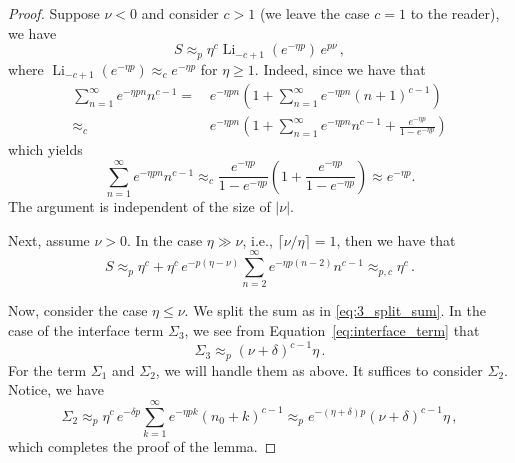 \documentclass[11pt]{amsart}
\theoremstyle{plain}
\theoremstyle{definition}
\newcommand		{\lt}			{\left}				%
\newcommand		{\rt}			{\right}			%
\renewcommand	{\(}			{\lt(}
\renewcommand	{\)}			{\rt)}
\newcommand		{\n}[1]			{\lt\lvert #1 \rt\rvert}
\begin{document}
	\begin{proof}
		Suppose $\nu<0$ and consider $c>1$ (we leave the case $c=1$ to the reader), we have 
		\begin{equation*}
			S \approx_p \eta^c \operatorname{Li}_{-c+1}(e^{-\eta p})\, e^{p\nu}\,,
		\end{equation*}
		where $\operatorname{Li}_{-c+1}(e^{-\eta p})\approx_c e^{-\eta p}$ for $\eta\ge 1$.
		Indeed, since we have that
        \begin{align*}
            \sum^\infty_{n=1}e^{-\eta p n}n^{c-1} =&\, e^{-\eta p n}\lt(1+\sum^\infty_{n=1}e^{-\eta p n} (n+1)^{c-1}\rt)
            \\
            \approx_c&\, e^{-\eta p n}\lt(1+\sum^\infty_{n=1}e^{-\eta p n} n^{c-1}+ \frac{e^{-\eta p}}{1-e^{-\eta p}}\rt) 
        \end{align*}
        which yields 
        \begin{equation*}
            \sum^\infty_{n=1}e^{-\eta p n}n^{c-1} \approx_c \frac{e^{-\eta p}}{1-e^{-\eta p}}\lt(1+\frac{e^{-\eta p}}{1-e^{-\eta p}}\rt) \approx e^{-\eta p}.
        \end{equation*}
        The argument is independent of the size of $\n{\nu}$.
        
        Next, assume $\nu> 0$. In the case $\eta\gg \nu$, i.e., $\lceil \nu/\eta\rceil = 1$, then we have that 
		\begin{equation*}
            S \approx_p  \eta^c + \eta^c \, e^{-p(\eta-\nu)}\sum^\infty_{n=2} e^{-\eta p (n-2)} n^{c-1} \approx_{p, c} \eta^c\,.
		\end{equation*}

		Now, consider the case $\eta\le \nu$. We split the sum as in \eqref{eq:3_split_sum}. In the case of the interface term $\Sigma_3$, we see from Equation~\eqref{eq:interface_term} that 
		\begin{equation*}
			\Sigma_3 \approx_p \lt(\nu+\delta\rt)^{c-1} \eta\,.
		\end{equation*}
		For the term $\Sigma_1$ and $\Sigma_2$, we will handle them as above. It suffices to consider $\Sigma_2$. Notice, we have 
		\begin{equation*}
			\Sigma_2 \approx_p \eta^c\, e^{-\delta p}\sum_{k=1}^\infty e^{-\eta p k}\lt(n_0+k\rt)^{c-1}\approx_p  e^{-\lt(\eta+\delta\rt) p} \lt(\nu + \delta\rt)^{c-1}\eta\,,
		\end{equation*}
		which completes the proof of the lemma. 
	\end{proof}
\end{document}
